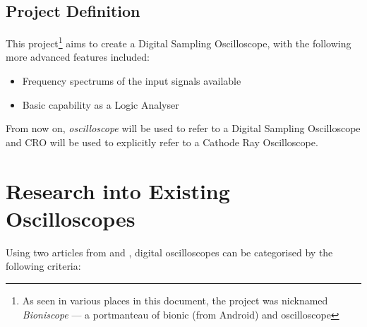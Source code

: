 \subsection*{Project Definition}

This project\footnote{As seen in various places in this document, the project
  was nicknamed \textit{Bioniscope} --- a portmanteau of bionic (from Android)
and oscilloscope} aims to create a Digital Sampling Oscilloscope, with the following
more advanced features included:

\begin{itemize}
  \item Frequency spectrums of the input signals available
  \item Basic capability as a Logic Analyser
\end{itemize}

From now on, \textit{oscilloscope} will be used to refer to a Digital Sampling
Oscilloscope and CRO will be used to explicitly refer to a Cathode Ray
Oscilloscope.

\section{Research into Existing Oscilloscopes}

Using two articles from \autocite{PicotechScopes} and
\autocite{GabotronicsScopes}, digital
oscilloscopes can be categorised by the following criteria:

